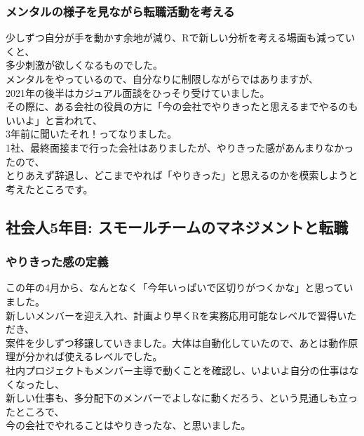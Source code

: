 \documentclass[
  letterpaper,
  DIV=11,
  numbers=noendperiod]{scrartcl}
\begin{document}
\hypertarget{ux30e1ux30f3ux30bfux30ebux306eux69d8ux5b50ux3092ux898bux306aux304cux3089ux8ee2ux8077ux6d3bux52d5ux3092ux8003ux3048ux308b}{%
\subsubsection{メンタルの様子を見ながら転職活動を考える}\label{ux30e1ux30f3ux30bfux30ebux306eux69d8ux5b50ux3092ux898bux306aux304cux3089ux8ee2ux8077ux6d3bux52d5ux3092ux8003ux3048ux308b}}

少しずつ自分が手を動かす余地が減り、Rで新しい分析を考える場面も減っていくと、\\
多少刺激が欲しくなるものでした。\\
メンタルをやっているので、自分なりに制限しながらではありますが、\\
2021年の後半はカジュアル面談をひっそり受けていました。\\
その際に、ある会社の役員の方に「今の会社でやりきったと思えるまでやるのもいいよ」と言われて、\\
3年前に聞いたそれ！ってなりました。\\
1社、最終面接まで行った会社はありましたが、やりきった感があんまりなかったので、\\
とりあえず辞退し、どこまでやれば「やりきった」と思えるのかを模索しようと考えたところです。

\hypertarget{ux793eux4f1aux4eba5ux5e74ux76ee-ux30b9ux30e2ux30fcux30ebux30c1ux30fcux30e0ux306eux30deux30cdux30b8ux30e1ux30f3ux30c8ux3068ux8ee2ux8077}{%
\subsection{社会人5年目:
スモールチームのマネジメントと転職}\label{ux793eux4f1aux4eba5ux5e74ux76ee-ux30b9ux30e2ux30fcux30ebux30c1ux30fcux30e0ux306eux30deux30cdux30b8ux30e1ux30f3ux30c8ux3068ux8ee2ux8077}}

\hypertarget{ux3084ux308aux304dux3063ux305fux611fux306eux5b9aux7fa9}{%
\subsubsection{やりきった感の定義}\label{ux3084ux308aux304dux3063ux305fux611fux306eux5b9aux7fa9}}

この年の4月から、なんとなく「今年いっぱいで区切りがつくかな」と思っていました。\\
新しいメンバーを迎え入れ、計画より早くRを実務応用可能なレベルで習得いただき、\\
案件を少しずつ移譲していきました。大体は自動化していたので、あとは動作原理が分かれば使えるレベルでした。\\
社内プロジェクトもメンバー主導で動くことを確認し、いよいよ自分の仕事はなくなったし、\\
新しい仕事も、多分配下のメンバーでよしなに動くだろう、という見通しも立ったところで、\\
今の会社でやれることはやりきったな、と思いました。
\end{document}
